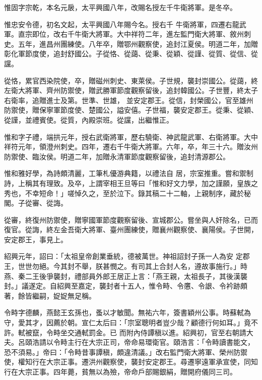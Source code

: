 \begin{pinyinscope}
 惟固字宗乾，本名元扆，太平興國八年，改賜名授左千牛衛將軍。是冬卒。



 惟忠安令德，初名文起，太平興國八年賜今名。授右千
 牛衛將軍，四遷右龍武軍。直宗即位，改右千牛衛大將軍。大中祥符二年，進左監門衛大將軍、敘州刺史。五年，進昌州團練使。八年卒，贈鄂州觀察使，追封江夏侯。明道二年，加贈彰化軍節度使，追封舒國公。子從恪、從藹、從秉、從穎、從謹、從質、從信、從讜。



 從恪，累官西染院使，卒，贈磁州刺史、東萊侯。子世規，襲封崇國公。從藹，終左衛大將軍、齊州防禦使，贈武勝軍節度觀察留後，追封韓國公。子世豐，終太子右衛率，追贈進士及第。世準、世雄，
 並安定郡王。從信，封榮國公，官至雄州防禦使，贈保寧軍節度使、楚國公，謚安僖。子世福，襲安定郡王。從秉、從穎、從謹，並禮賓使。從質，內殿崇班。從讜，出繼惟正。



 惟和字子禮，端拱元年，授右武衛將軍，歷右驍衛、神武龍武軍、右衛將軍。大中祥符元年，領澄州刺史。四年，遷右千牛衛大將軍。六年，卒，年三十六。贈汝州防禦使、臨汝侯。明道二年，加贈永清軍節度觀察留後，追封清源郡公。



 惟和雅好學，為詩頗清麗，工筆札優游典籍，以禮法自
 居，宗室推重。嘗和禦制詩，上稱其有理致。及卒，上謂宰相王旦等曰「惟和好文力學，加之謹願，皇族之秀也，不幸短命！」嗟悼久之，至於泣下。錄其稿二十二軸，上親制序，藏於秘閣。子從審、從誨。



 從審，終復州防禦使，贈寧國軍節度觀察留後、宣城郡公。嘗坐與人奸除名，已而復官。從誨，終左金吾衛大將軍、臺州團練使，贈襄州觀察使、襄陽侯。子世開，安定郡王，事見上。



 紹興元年，詔曰：「太祖皇帝創業垂統，德被萬世。神祖詔封子孫一人為安
 定郡王，世世勿絕。今其封不舉，朕甚憫之。有司其上合封人名，遵故事施行。」時燕、秦二王後爭襲封，禮部員外郎王居正上言：「燕王親，太祖長子，其後漢襲封。」議遂定。自紹興至嘉定，襲封者十五人，惟令畤、令懬、令詪、令衿跡頗著，餘皆繼嗣，娖娖無足稱。



 令畤字德麟，燕懿王玄孫也，蚤以才敏聞。無祐六年，簽書穎州公事。時蘇軾為守，愛其才，因薦於朝。宣仁太后曰：「宗室聰明者豈少哉？顧德行何如耳。」竟不許。軾被竄，令畤坐交通軾罰金。已
 而附內侍譚稹以進。紹興初，官至右朝請大夫。呂頤浩請以令畤主行在大宗正司，帝命易環衛官。頤浩言：「令畤讀書能文，恐不須易。」帝曰：「令畤昔事譚稹，頗違清議。」改右監門衛大將軍、榮州防禦使，權知行在大宗正事。遷洪州觀察使，襲封安定郡王。尋遷寧遠軍承宣使，同知行在大宗正事。四年薨，貧無以為殮，帝命戶部賜銀絹，贈開府儀同三司。




\end{pinyinscope}
